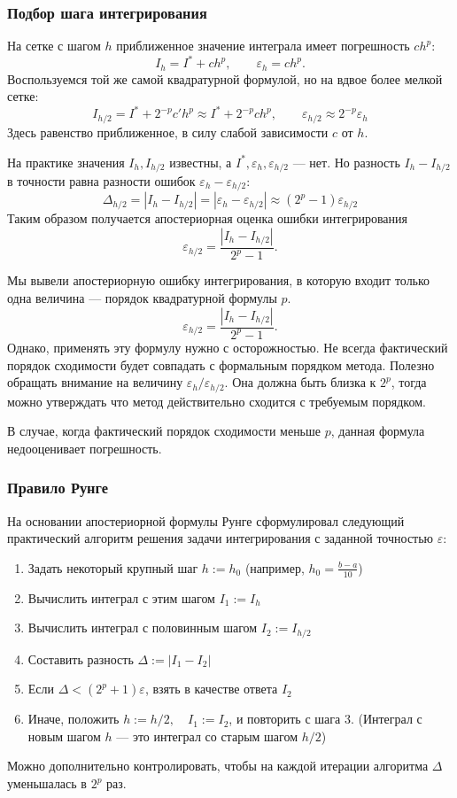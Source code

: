 \documentclass[apectratio=43,unicode]{beamer}
\begin{document}
\begin{frame}
\frametitle{Подбор шага интегрирования}
	На сетке с шагом $h$ приближенное значение интеграла имеет погрешность $ch^p$:
	\[
		I_h = I^* + c h^p, \qquad \varepsilon_h = c h^p.
	\]
	Воспользуемся той же самой квадратурной формулой, но на вдвое более мелкой
	сетке:
	\[
		I_{h/2} = I^* + 2^{-p} c' h^p \approx I^* + 2^{-p} c h^p, \qquad
		\varepsilon_{h/2} \approx 2^{-p} \varepsilon_h
	\]
	Здесь равенство приближенное, в силу слабой зависимости $c$ от $h$.

	На практике значения $I_{h}, I_{h/2}$ известны, а $I^{*}, \varepsilon_{h},
	\varepsilon_{h/2}$ --- нет. Но разность $I_h - I_{h/2}$ в точности равна
	разности ошибок $\varepsilon_h - \varepsilon_{h/2}$:
	\[
		\Delta_{h/2} = |I_h - I_{h/2}| = |\varepsilon_{h} - \varepsilon_{h/2}| \approx
		(2^p - 1) \varepsilon_{h/2}
	\]
	Таким образом получается апостериорная оценка ошибки интегрирования
	\[
		\varepsilon_{h/2} = \frac{|I_h - I_{h/2}|}{2^p - 1}.
	\]
\end{frame}

\begin{frame}
	Мы вывели апостериорную ошибку интегрирования, в которую входит только одна
	величина --- порядок квадратурной формулы $p$.
	\[
		\varepsilon_{h/2} = \frac{|I_h - I_{h/2}|}{2^p - 1}.
	\]
	Однако, применять эту формулу нужно с осторожностью. Не всегда фактический
	порядок сходимости будет совпадать с формальным порядком метода. Полезно
	обращать внимание на величину $\varepsilon_{h} / \varepsilon_{h/2}$. Она должна
	быть близка к $2^p$, тогда можно утверждать что метод действительно сходится с
	требуемым порядком.

	В случае, когда фактический порядок сходимости меньше $p$, данная формула
	недооценивает погрешность.
\end{frame}

\begin{frame}
\frametitle{Правило Рунге}
	На основании апостериорной формулы Рунге сформулировал следующий практический
	алгоритм решения задачи интегрирования с заданной точностью $\varepsilon$:
	\begin{enumerate}
	\item Задать некоторый крупный шаг $h := h_0$ (например, $h_0 = \frac{b-a}{10}$)
	\item Вычислить интеграл с этим шагом $I_1 := I_{h}$
	\item Вычислить интеграл с половинным шагом $I_2 := I_{h / 2}$
	\item Составить разность $\Delta := |I_1 - I_2|$
	\item Если $\Delta < (2^p + 1)\varepsilon$, взять в качестве ответа
	$I_2$
	\item Иначе, положить $h := h / 2,\quad I_1 := I_2$, и повторить с шага 3. (Интеграл с новым
	шагом $h$ --- это интеграл со старым шагом $h/2$)
	\end{enumerate}
	Можно дополнительно контролировать, чтобы на каждой итерации алгоритма $\Delta$
	уменьшалась в $2^p$ раз.
\end{frame}
\end{document}
